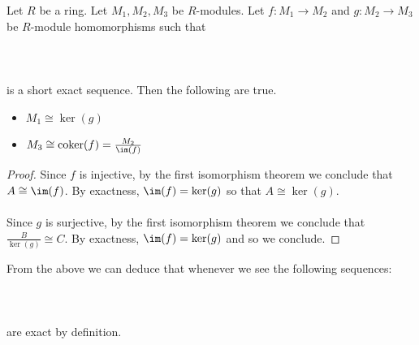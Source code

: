 \documentclass[a4paper]{article}
\begin{document}
\begin{lmm}{}{} Let $R$ be a ring. Let $M_1,M_2,M_3$ be $R$-modules. Let $f:M_1\to M_2$ and $g:M_2\to M_3$ be $R$-module homomorphisms such that \\~\\
\\~\\
is a short exact sequence. Then the following are true. 
\begin{itemize}
\item $M_1\cong\ker(g)$
\item $M_3\cong\text{coker}(f)=\frac{M_2}{\im(f)}$
\end{itemize} 
\begin{proof}
Since $f$ is injective, by the first isomorphism theorem we conclude that $A\cong\im(f)$. By exactness, $\im(f)=\ker(g)$ so that $A\cong\ker(g)$. \\~\\

Since $g$ is surjective, by the first isomorphism theorem we conclude that $\frac{B}{\ker(g)}\cong C$. By exactness, $\im(f)=\ker(g)$ and so we conclude. 
\end{proof}
\end{lmm}

From the above we can deduce that whenever we see the following sequences: \\~\\
\\~\\
are exact by definition. 
\end{document}
